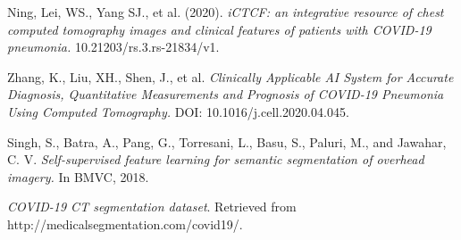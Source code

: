 \begin{thebibliography}{1}
	 Ning, Lei, WS., Yang SJ., et al. (2020). \textit{iCTCF: an integrative resource of chest computed tomography images and clinical features of patients with COVID-19 pneumonia.} 10.21203/rs.3.rs-21834/v1.

	 Zhang, K., Liu, XH., Shen, J., et al. \textit{Clinically Applicable AI System for Accurate Diagnosis, Quantitative Measurements and Prognosis of COVID-19 Pneumonia Using Computed Tomography.} DOI: 10.1016/j.cell.2020.04.045.
	
	  Singh, S., Batra, A., Pang, G., Torresani, L., Basu, S.,  Paluri, M., and Jawahar, C. V.  \textit{Self-supervised feature learning for semantic segmentation of
	overhead imagery.} In BMVC, 2018.

	 \textit{COVID-19 CT segmentation dataset}. Retrieved from http://medicalsegmentation.com/covid19/.

\end{thebibliography}
